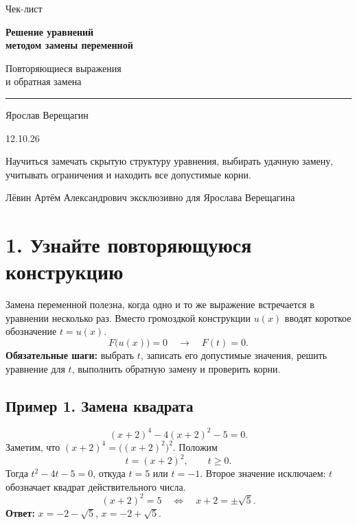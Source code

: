 \documentclass[a4paper,12pt]{article}
\newcommand{\key}[1]{{\color{darkaccent}\textbf{#1}}}
\newcommand{\headsec}[1]{\section*{\color{darkaccent}#1}\vspace{-5pt}{\color{hairline}\rule{\linewidth}{0.55pt}}\par\vspace{1pt}}
\newcommand{\headsub}[1]{\subsection*{\color{accent}#1}}
\begin{document}
\hypersetup{pageanchor=false}
\begin{titlepage}
\thispagestyle{empty}
\centering
\vspace*{28mm}
{\large\color{quiet}Чек-лист}\par
\vspace{7mm}
{\fontsize{29}{34}\selectfont\bfseries\color{darkaccent}
Решение уравнений\\[2mm]методом замены переменной}\par
\vspace{9mm}
{\Large\color{accent}Повторяющиеся выражения\\и обратная замена}\par
\vspace{17mm}
{\color{hairline}\rule{0.73\linewidth}{0.7pt}}\par
\vspace{10mm}
{\large Ярослав Верещагин}\par
\vspace{3mm}
{\normalsize 12.10.26}\par
\vfill
\begin{minipage}{0.82\linewidth}
\centering\normalsize
Научиться замечать скрытую структуру уравнения, выбирать удачную замену,
учитывать ограничения и находить все допустимые корни.
\end{minipage}
\vspace{13mm}
\par
\vspace{9mm}
{\small\color{quiet}Лёвин Артём Александрович эксклюзивно для Ярослава Верещагина}
\end{titlepage}
\hypersetup{pageanchor=true}

\headsec{1. Узнайте повторяющуюся конструкцию}
Замена переменной полезна, когда одно и то же выражение встречается в уравнении несколько раз.
Вместо громоздкой конструкции \(u(x)\) вводят короткое обозначение \(t=u(x)\).
\[
  F\bigl(u(x)\bigr)=0\quad\longrightarrow\quad F(t)=0.
\]
\key{Обязательные шаги:} выбрать \(t\), записать его допустимые значения, решить уравнение для \(t\), выполнить обратную замену и проверить корни.

\headsub{Пример 1. Замена квадрата}
\[
 (x+2)^4-4(x+2)^2-5=0.
\]
Заметим, что \((x+2)^4=\bigl((x+2)^2\bigr)^2\). Положим
\[
 t=(x+2)^2,\qquad t\ge0.
\]
Тогда \(t^2-4t-5=0\), откуда \(t=5\) или \(t=-1\). Второе значение исключаем:
\(t\) обозначает квадрат действительного числа.
\[
 (x+2)^2=5\quad\Longleftrightarrow\quad x+2=\pm\sqrt5.
\]
\key{Ответ:} \(x=-2-\sqrt5\), \(x=-2+\sqrt5\).
\end{document}
